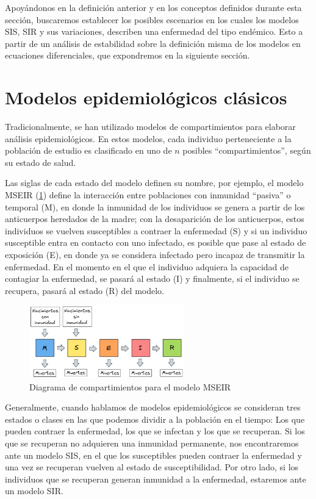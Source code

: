 Apoyándonos en la definición anterior y en los conceptos definidos durante esta sección, buscaremos establecer los posibles escenarios en los cuales los modelos SIS, SIR y sus variaciones, describen una enfermedad del tipo endémico. Esto a partir de un análisis de estabilidad sobre la definición misma de los modelos en ecuaciones diferenciales, que expondremos en la siguiente sección.

\section{Modelos epidemiológicos clásicos}\label{sec:ModelosEpidemiológicosClásicos}

Tradicionalmente, se han utilizado modelos de compartimientos para elaborar análisis epidemiológicos. En estos modelos, cada individuo perteneciente a la población de estudio es clasificado en uno de $n$ posibles ``compartimientos'', según su estado de salud.

Las siglas de cada estado del modelo definen su nombre, por ejemplo, el modelo MSEIR (\ref{fig:MSEIR}) define la interacción entre poblaciones con inmunidad ``pasiva'' o temporal (M), en donde la inmunidad de los individuos se genera a partir de los anticuerpos heredados de la madre; con la desaparición de los anticuerpos, estos individuos se vuelven susceptibles a contraer la enfermedad (S) y si un individuo susceptible entra en contacto con uno infectado, es posible que pase al estado de exposición (E), en donde ya se considera infectado pero incapaz de transmitir la enfermedad. En el momento en el que el individuo adquiera la capacidad de contagiar la enfermedad, se pasará al estado (I) y finalmente, si el individuo se recupera, pasará al estado (R) del modelo.\cite{modelCompartimental}

\begin{figure}[h]
  \centering
    \includegraphics[width=0.6\textwidth]{Imagenes/MSEIR_compatimientos.PNG}
  \caption{Diagrama de compartimientos para el modelo MSEIR}
  \label{fig:MSEIR}
\end{figure}

Generalmente, cuando hablamos de modelos epidemiológicos se consideran tres estados o clases en las que podemos dividir a la población en el tiempo: Los que pueden contraer la enfermedad, los que se infectan y los que se recuperan. Si los que se recuperan no adquieren una inmunidad permanente, nos encontraremos ante un modelo SIS, en el que los susceptibles pueden contraer la enfermedad y una vez se recuperan vuelven al estado de susceptibilidad. Por otro lado, si los individuos que se recuperan generan inmunidad a la enfermedad, estaremos ante un modelo SIR. 

